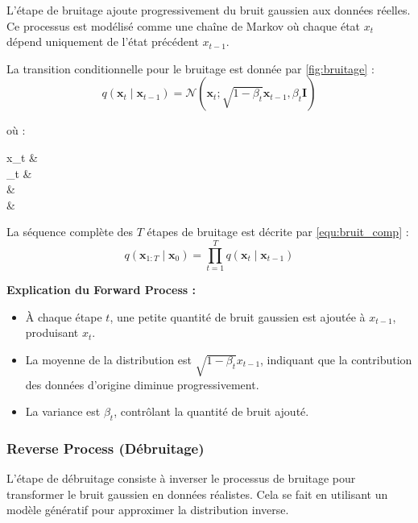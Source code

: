 L'étape de bruitage ajoute progressivement du bruit gaussien aux données
réelles. Ce processus est modélisé comme une chaîne de Markov où chaque état \(
x_t \) dépend uniquement de l'état précédent \( x_{t-1} \).

La transition conditionnelle pour le bruitage est donnée par \ref{fig:bruitage}
:
\begin{equation}
	q(\mathbf{x}_t \mid \mathbf{x}_{t-1}) = \mathcal{N}(\mathbf{x}_t; \sqrt{1 - \beta_t} \mathbf{x}_{t-1}, \beta_t \mathbf{I})
	\label{fig:bruitage}
\end{equation}

où :
\begin{conditions}
	x_t &  \\
	\beta_t &  \\
	 &  \\
	 & 
\end{conditions}

La séquence complète des \( T \) étapes de bruitage est décrite par
\ref{equ:bruit_comp} :
\begin{equation}
	q(\mathbf{x}_{1:T} \mid \mathbf{x}_0) = \prod_{t=1}^T q(\mathbf{x}_t \mid \mathbf{x}_{t-1})
	\label{equ:bruit_comp}
\end{equation}

\textbf{Explication du Forward Process :}

\begin{itemize}
	\item À chaque étape \( t \), une petite quantité de bruit gaussien est ajoutée à \( x_{t-1} \), produisant \( x_t \).
	\item La moyenne de la distribution est \( \sqrt{1 - \beta_t} x_{t-1} \), indiquant
	      que la contribution des données d'origine diminue progressivement.
	\item La variance est \( \beta_t \), contrôlant la quantité de bruit ajouté.
\end{itemize}

\subsubsection{Reverse Process (Débruitage)}

L'étape de débruitage consiste à inverser le processus de bruitage pour
transformer le bruit gaussien en données réalistes. Cela se fait en utilisant
un modèle génératif pour approximer la distribution inverse.

